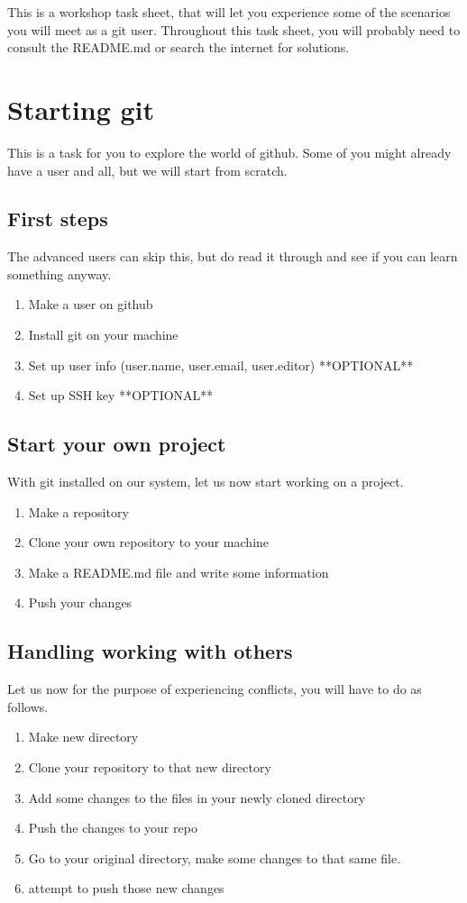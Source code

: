 \documentclass[12 pt,a4paper]{article}
\newcommand{\Fin}{
\vfill
\begin{center}
\textit{ }\label{FIN}
\end{center}}
\begin{document}
\noindent This is a workshop task sheet, 
that will let you experience some of the scenarios you will meet as a git user.
Throughout this task sheet,
you will probably need to consult the README.md or search the internet for solutions.

\section*{Starting git}
This is a task for you to explore the world of github.
Some of you might already have a user and all, 
but we will start from scratch.

\subsection*{First steps}
The advanced users can skip this,
but do read it through and see if you can learn something anyway.
\begin{enumerate}
  \item Make a user on github
  \item Install git on your machine
  \item Set up user info (user.name, user.email, user.editor) **OPTIONAL**
  \item Set up SSH key **OPTIONAL**
\end{enumerate}

\subsection*{Start your own project}
With git installed on our system, let us now start working on a project.
\begin{enumerate}
\item Make a repository
\item Clone your own repository to your machine
\item Make a README.md file and write some information
\item Push your changes
\end{enumerate}

\subsection*{Handling working with others}
Let us now for the purpose of experiencing conflicts, you will have to do as follows.

\begin{enumerate}
\item Make new directory
\item Clone your repository to that new directory
\item Add some changes to the files in your newly cloned directory
\item Push the changes to your repo
\item Go to your original directory, make some changes to that same file.
\item attempt to push those new changes
\end{enumerate}

\Fin
\end{document}
